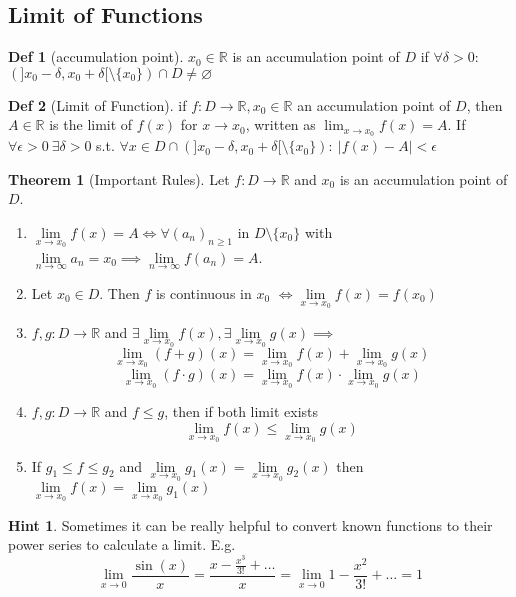 \documentclass[a4paper, 10pt]{article}
\theoremstyle{definition}
\newtheorem*{definition}{Def}
\newtheorem*{note_wrapper}{Hint}
\theoremstyle{named}
\newtheorem*{ntheorem_wrapper}{Theorem}
\newenvironment{ntheorem}%
    {\begin{mdframed}[style=important]\begin{ntheorem_wrapper}}%
    {\end{ntheorem_wrapper}\end{mdframed}}
\newenvironment{note}%
    {\begin{mdframed}[style=trick]\begin{note_wrapper}}%
    {\end{note_wrapper}\end{mdframed}}
\newcommand{\R}{\mathbb{R}}
\begin{document}
\subsection{Limit of Functions}
\begin{definition}[accumulation point]
    $x_0 \in \R$ is an accumulation point of $D$ if $\forall \delta > 0$: $(]x_0 - \delta, x_0 + \delta[ \setminus \{x_0\}) \cap D \neq \varnothing$
\end{definition}

\begin{definition}[Limit of Function]
    if $f : D \to \R, x_0 \in \R$ an accumulation point of $D$, then $A \in \R$ is the limit of $f(x)$ for $x \to x_0$, written as $\lim_{x \to x_0} f(x) = A$. If $\forall \epsilon > 0 \ \exists \delta > 0$ s.t. $\forall x \in D \cap (]x_0 - \delta, x_0 + \delta[ \setminus \{x_0\}): \ |f(x) - A| < \epsilon$
\end{definition}

\begin{ntheorem}[Important Rules]
    Let $f: D \to \R$ and $x_0$ is an accumulation point of $D$.
    \begin{enumerate}
        \item $\lim\limits_{x \to x_0} f(x) = A \iff \forall (a_n)_{n \geq 1}$ in $D \setminus \{x_0\}$ with $\lim\limits_{n \to \infty} a_n = x_0 \implies \lim\limits_{n \to \infty} f(a_n) = A$.
        \item Let $x_0 \in D$. Then $f$ is continuous in $x_0$ \newline $\iff \lim\limits_{x \to x_0} f(x) = f(x_0)$
        \item $f, g: D \to \R$ and $\exists \lim\limits_{x \to x_0} f(x), \exists \lim\limits_{x \to x_0} g(x) \implies$
        $$\lim_{x \to x_0} (f + g)(x) = \lim_{x \to x_0} f(x) + \lim_{x \to x_0} g(x)$$
        $$\lim_{x \to x_0} (f \cdot g) (x) = \lim_{x \to x_0}f(x) \cdot \lim_{x \to x_0} g(x)$$
        \item $f, g: D \to \R$ and $f \leq g$, then if both limit exists
        $$\lim_{x \to x_0} f(x) \leq \lim_{x \to x_0} g(x)$$ 
        \item If $g_1 \leq f \leq g_2$ and $\lim\limits_{x \to x_0} g_1(x) = \lim\limits_{x \to x_0} g_2(x)$ then $\lim\limits_{x \to x_0} f(x) = \lim\limits_{x \to x_0} g_1(x)$
    \end{enumerate}
\end{ntheorem}

\begin{note}
    Sometimes it can be really helpful to convert known functions to their power series to calculate a limit. E.g.
    $$\lim_{x \to 0} \frac{\sin(x)}{x} = \frac{x - \frac{x^3}{3!} + \ldots}{x} = \lim_{x \to 0} 1 - \frac{x^2}{3!} + \ldots = 1$$
\end{note}
\end{document}
